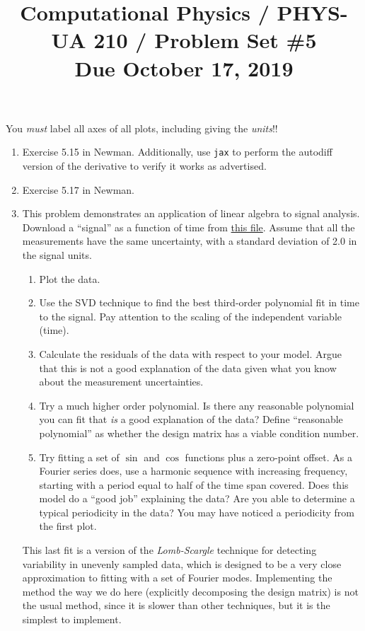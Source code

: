 \documentclass[11pt, preprint]{aastex}
\begin{document}
\title{\bf Computational Physics / PHYS-UA 210 / Problem Set \#5
\\ Due October 17, 2019 }

You {\it must} label all axes of all plots, including giving the {\it
  units}!!

\begin{enumerate}
  \item Exercise 5.15 in Newman. Additionally, use {\tt jax} to
    perform the autodiff version of the derivative to verify it works
    as advertised.
  \item Exercise 5.17 in Newman.
  \item This problem demonstrates an application of linear algebra to
    signal analysis. Download a ``signal'' as a function of time from
    \href{https://github.com/blanton144/computational-grad/blob/main/data/signal.dat}{this
      file}. Assume that all the measurements have the same
    uncertainty, with a standard deviation of 2.0 in the signal units.
    \begin{enumerate}
      \item Plot the data.
      \item Use the SVD technique to find the best third-order
        polynomial fit in time to the signal. Pay attention to the
        scaling of the independent variable (time).
      \item Calculate the residuals of the data with respect to your
        model. Argue that this is not a good explanation of the data
        given what you know about the measurement uncertainties.
      \item Try a much higher order polynomial. Is there any
        reasonable polynomial you can fit that {\it is} a good
        explanation of the data? Define ``reasonable polynomial'' as
        whether the design matrix has a viable condition number.
      \item Try fitting a set of $\sin$ and $\cos$ functions plus a
        zero-point offset. As a Fourier series does, use a harmonic
        sequence with increasing frequency, starting with a period
        equal to half of the time span covered. Does this model do a
        ``good job'' explaining the data? Are you able to determine a
        typical periodicity in the data? You may have noticed a
        periodicity from the first plot.
    \end{enumerate}
    This last fit is a version of the {\it Lomb-Scargle} technique for
    detecting variability in unevenly sampled data, which is designed
    to be a very close approximation to fitting with a set of Fourier
    modes. Implementing the method the way we do here (explicitly
    decomposing the design matrix) is not the usual method, since it
    is slower than other techniques, but it is the simplest to
    implement.
\end{enumerate}
\end{document}
